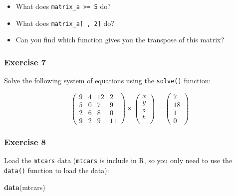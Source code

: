 \documentclass[]{gitbook}
\newenvironment{Shaded}{\begin{snugshade}}{\end{snugshade}}
\newcommand{\KeywordTok}[1]{\textcolor[rgb]{0.13,0.29,0.53}{\textbf{#1}}}
\newcommand{\NormalTok}[1]{#1}
\providecommand{\tightlist}{%
  \setlength{\itemsep}{0pt}\setlength{\parskip}{0pt}}
\begin{document}
\begin{itemize}
\tightlist
\item
  What does \texttt{matrix\_a\ \textgreater{}=\ 5} do?
\item
  What does \texttt{matrix\_a{[}\ ,\ 2{]}} do?
\item
  Can you find which function gives you the transpose of this matrix?
\end{itemize}

\hypertarget{exercise-7}{%
\subsubsection*{Exercise 7}\label{exercise-7}}

Solve the following system of equations using the \texttt{solve()} function:

\[
\left(
\begin{array}{cccc}
 9 & 4 & 12 & 2 \\
 5 & 0 & 7 & 9\\
 2 & 6 & 8 & 0\\
 9 & 2 & 9 & 11
\end{array} \right) \times \left(
\begin{array}{ccc}
 x \\
 y \\
 z \\
 t \\
\end{array}\right) =
\left(
\begin{array}{ccc}
7\\
18\\
1\\
0
\end{array}
\right)
\]

\hypertarget{exercise-8}{%
\subsubsection*{Exercise 8}\label{exercise-8}}

Load the \texttt{mtcars} data (\texttt{mtcars} is include in R, so you only need to use the \texttt{data()} function to
load the data):

\begin{Shaded}
\begin{Highlighting}[]
\KeywordTok{data}\NormalTok{(mtcars)}
\end{Highlighting}
\end{Shaded}
\end{document}
